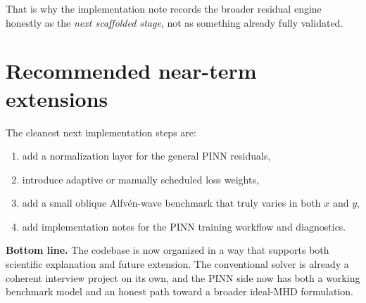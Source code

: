 \documentclass[11pt]{article}
\begin{document}
That is why the implementation note records the broader residual engine honestly as the \emph{next scaffolded stage}, not as something already fully validated.

\section{Recommended near-term extensions}
The cleanest next implementation steps are:
\begin{enumerate}[leftmargin=1.8em]
    \item add a normalization layer for the general PINN residuals,
    \item introduce adaptive or manually scheduled loss weights,
    \item add a small oblique Alfv\'en-wave benchmark that truly varies in both $x$ and $y$,
    \item add implementation notes for the PINN training workflow and diagnostics.
\end{enumerate}

\begin{overviewbox}
\textbf{Bottom line.} The codebase is now organized in a way that supports both scientific explanation and future extension. The conventional solver is already a coherent interview project on its own, and the PINN side now has both a working benchmark model and an honest path toward a broader ideal-MHD formulation.
\end{overviewbox}
\end{document}
